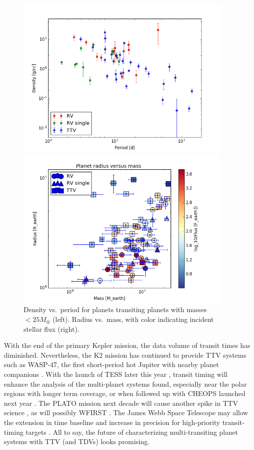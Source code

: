 \documentclass[graybox,natbib,nosecnum]{svmult}
\begin{document}
\begin{figure}
\centerline{
\includegraphics[width=0.95\textwidth]{density_vs_period_errors.png}}
\centerline{
\includegraphics[width=0.95\textwidth]{mass_radius_flux.png}}
\caption{Density vs.\ period for planets transiting planets with masses $<25 M_\oplus$ (left).  Radius
vs.\ mass, with color indicating incident stellar flux (right).}
\label{fig:density_period}
\end{figure}

With the end of the primary Kepler mission, the data volume of transit times has diminished.
Nevertheless, the K2 mission has continued to provide TTV systems such as WASP-47, the first
short-period hot Jupiter with nearby planet companions \citep{2015Becker}.  With the launch
of TESS later this year \citep{2014SPIE.9143E..20R}, transit timing will enhance the analysis 
of the multi-planet systems found, especially near the polar regions with longer term coverage, 
or when followed up with CHEOPS launched next year \citep{2014PASP..126.1134B}. 
The PLATO mission next decade will cause another spike in TTV science \citep{2014ExA....38..249R},
as will possibly WFIRST \citep{2016arXiv161003067M}. The James Webb Space Telescope may allow the
extension in time baseline and increase in precision for high-priority transit-timing targets 
\citep{2014PASP..126.1134B}.  All to say, the future of characterizing multi-transiting planet
systems with TTV (and TDVs) looks promising.
\end{document}
